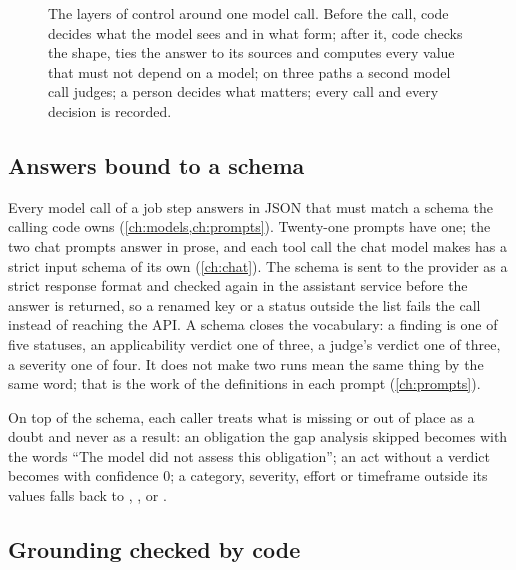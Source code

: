 \begin{figure}[H]
\actorlegend
\caption{The layers of control around one model call. Before the call, code decides what the
model sees and in what form; after it, code checks the shape, ties the answer to its sources
and computes every value that must not depend on a model; on three paths a second model
call judges; a person decides what matters; every call and every decision is recorded.}\label{fig:control:layers}
\end{figure}

\subsection{Answers bound to a schema}\label{sec:control:schema}

Every model call of a job step answers in JSON that must match a schema the calling code
owns (\cref{ch:models,ch:prompts}). Twenty-one prompts have one; the two chat prompts answer
in prose, and each tool call the chat model makes has a strict input schema of its own
(\cref{ch:chat}). The schema is sent to the provider as a strict response format and checked
again in the assistant service before the answer is returned, so a renamed key or a status
outside the list fails the call instead of reaching the API. A schema closes the vocabulary:
a finding is one of five statuses, an applicability verdict one of three, a judge's verdict
one of three, a severity one of four. It does not make two runs mean the same thing by the
same word; that is the work of the definitions in each prompt (\cref{ch:prompts}).

On top of the schema, each caller treats what is missing or out of place as a doubt and
never as a result: an obligation the gap analysis skipped becomes  with the
words \enquote{The model did not assess this obligation}; an act without a verdict becomes
 with confidence 0; a category, severity, effort or timeframe outside its
values falls back to , ,  or .

\subsection{Grounding checked by code}\label{sec:control:grounding}

